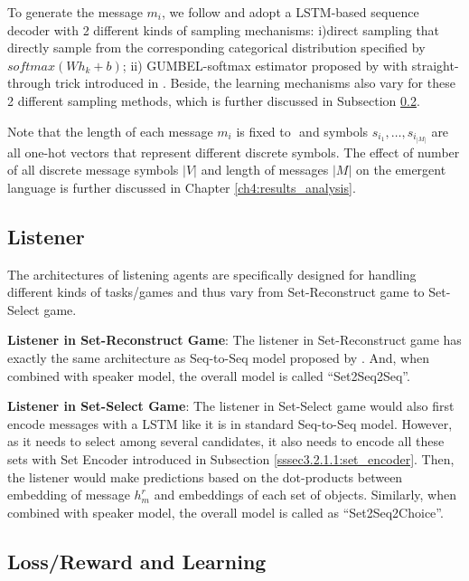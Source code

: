 To generate the message $m_i$, we follow \cite{havrylov2017emergence} and adopt a LSTM-based sequence decoder with 2 different kinds of sampling mechanisms: i)direct sampling that directly sample from the corresponding categorical distribution specified by $softmax(Wh_k + b)$; ii) GUMBEL-softmax estimator proposed by \cite{jang2016categorical} with straight-through trick introduced in \cite{bengio2013estimating}. Beside, the learning mechanisms also vary for these 2 different sampling methods, which is further discussed in Subsection \ref{ssec3.2.3:loss_learning}.

Note that the length of each message $m_i$ is fixed to $ $ and symbols $s_{i_1},\dots,s_{i_|M|}$ are all one-hot vectors that represent different discrete symbols. The effect of number of all discrete message symbols $|V|$ and length of messages $|M|$ on the emergent language is further discussed in Chapter \ref{ch4:results_analysis}.

\subsection{Listener}
\label{ssec3.2.2:listeners}

The architectures of listening agents are specifically designed for handling different kinds of tasks/games and thus vary from Set-Reconstruct game to Set-Select game.

\noindent\textbf{Listener in Set-Reconstruct Game}: The listener in Set-Reconstruct game has exactly the same architecture as Seq-to-Seq model proposed by \cite{sutskever2014sequence}. And, when combined with speaker model, the overall model is called ``Set2Seq2Seq''.

\noindent\textbf{Listener in Set-Select Game}: The listener in Set-Select game would also first encode messages with a LSTM like it is in standard Seq-to-Seq model. However, as it needs to select among several candidates, it also needs to encode all these sets with Set Encoder introduced in Subsection \ref{sssec3.2.1.1:set_encoder}. Then, the listener would make predictions based on the dot-products between embedding of message $h^r_m$ and embeddings of each set of objects. Similarly, when combined with speaker model, the overall model is called as ``Set2Seq2Choice''.

\subsection{Loss/Reward and Learning}
\label{ssec3.2.3:loss_learning}

